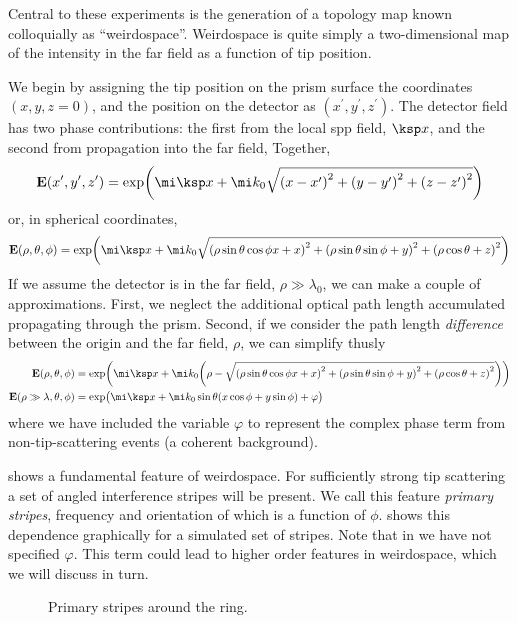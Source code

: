 Central to these experiments is the generation of a topology map known
colloquially as ``weirdospace''.  Weirdospace is quite simply
a two-dimensional map of the intensity in the far field as a function of tip
position.

We begin by assigning the tip position on the prism surface the coordinates
$(x,y,z=0)$, and the position on the detector as
$(x^\prime,y^\prime,z^\prime)$.  The detector field has two phase
contributions: the first from the local \gls{spp} field, $\ksp x$, and the second
from propagation into the far field, Together,
\begin{equation}
  \mathbf{E}(x^\prime,y^\prime,z^\prime) = \exp\!{\left( \mi\ksp x + \mi k_0\sqrt{{(x-x^\prime)}^2+{(y-y^\prime)}^2+ {(z-z^\prime)}^2 } \right)}
\end{equation}
or, in spherical coordinates,
\begin{equation}
  \mathbf{E}(\rho,\theta,\phi) = \exp\!{\left( \mi\ksp x + %
  \mi k_0\sqrt{{(\rho\sin\theta\cos\phi x+x)}^2+{(\rho\sin\theta\sin\phi+y)}^2+{(\rho\cos\theta+z)}^2 } \right)}
  \label{eqn:dingusthusly}
\end{equation}
If we assume the detector is in the far field, $\rho\gg\lambda_0$, we can
make a couple of approximations.  First, we neglect the additional optical
path length accumulated propagating through the prism.  Second, if we
consider the path length \textit{difference} between the origin and the far field,
$\rho$, we can simplify  thusly
\begin{align}
  \mathbf{E}(\rho,\theta,\phi)           & = \exp\!{\left( \mi\ksp x + %
  \mi k_0{\left(\rho-\sqrt{{(\rho\sin\theta\cos\phi x+x)}^2+{(\rho\sin\theta\sin\phi+y)}^2+{(\rho\cos\theta+z)}^2
  }\right)} \right)}                                                   \\
  \mathbf{E}(\rho\gg\lambda,\theta,\phi) & = \exp\!{\big( \mi \ksp x
  + \mi k_0 \sin\theta {\left(x\cos\phi+y\sin\phi\right)}
  + \varphi\big)}
  \label{eqn:primarystripes}
\end{align}
where we have included the variable $\varphi$ to represent the complex phase term
from non-tip-scattering events (a coherent background).

 shows a fundamental feature of weirdospace.
For sufficiently strong tip scattering a set of angled interference stripes
will be present.  We call this feature \textit{primary stripes},
frequency and orientation of which is a function of $\phi$.
 shows this
dependence graphically for a simulated set of stripes.  Note that in
 we have not specified $\varphi$.  This term
could lead to higher order features in weirdospace, which we will discuss
in turn.
\begin{figure}
  \centering
  \caption{Primary stripes around the ring.}
  \label{fig:primarystripes}
\end{figure}
